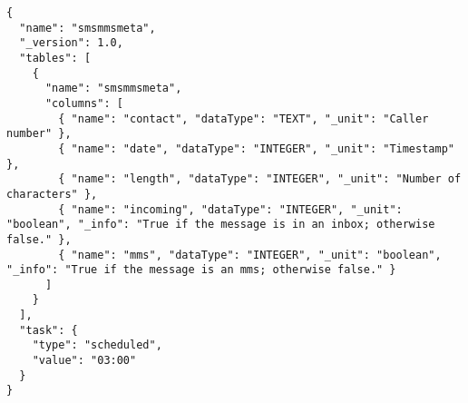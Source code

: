 \begin{lstlisting}[float,
basicstyle=\ttfamily\footnotesize,
caption={Modul definitionen for sms/mms},label=module:sms]
{
  "name": "smsmmsmeta",
  "_version": 1.0,
  "tables": [
    {
      "name": "smsmmsmeta",
      "columns": [
        { "name": "contact", "dataType": "TEXT", "_unit": "Caller number" },
        { "name": "date", "dataType": "INTEGER", "_unit": "Timestamp" },
        { "name": "length", "dataType": "INTEGER", "_unit": "Number of characters" },
        { "name": "incoming", "dataType": "INTEGER", "_unit": "boolean", "_info": "True if the message is in an inbox; otherwise false." },
        { "name": "mms", "dataType": "INTEGER", "_unit": "boolean", "_info": "True if the message is an mms; otherwise false." }
      ]
    }
  ],
  "task": {
    "type": "scheduled",
    "value": "03:00"
  }
}
\end{lstlisting}